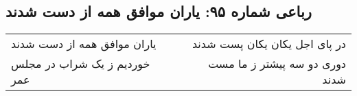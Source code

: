 \begin{center}
\section*{رباعی شماره ۹۵: یاران موافق همه از دست شدند}
\label{sec:sh095}
\begin{longtable}{l p{0.5cm} r}
یاران موافق همه از دست شدند
&&
در پای اجل یکان یکان پست شدند
\\
خوردیم ز یک شراب در مجلس عمر
&&
دوری دو سه پیشتر ز ما مست شدند
\\
\end{longtable}
\end{center}
